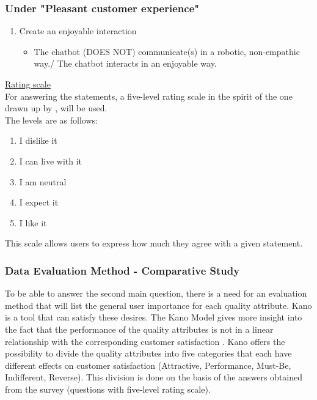 \subsubsection{Under "Pleasant customer experience"}
\begin{enumerate}
	\item Create an enjoyable interaction
	\begin{itemize}
		\item The chatbot (DOES NOT) communicate(s) in a robotic, non-empathic way./ The chatbot interacts in an enjoyable way.
	\end{itemize}
\end{enumerate}
\ul{Rating scale}\\
For answering the statements, a five-level rating scale in the spirit of the one drawn up by \citep{KANO1984}, will be used.\\
\break
The levels are as follows:\\
\begin{enumerate}
	\item I dislike it
	\item I can live with it
	\item I am neutral
	\item I expect it
	\item I like it
\end{enumerate}
This scale allows users to express how much they agree with a given statement.\\

\subsubsection{Data Evaluation Method - Comparative Study}
To be able to answer the second main question, there is a need for an evaluation method that will list the general user importance for each quality attribute. Kano is a tool that can satisfy these desires. The Kano Model gives more insight into the fact that the performance of the quality attributes is not in a linear relationship with the corresponding customer satisfaction \citep{KANO1984}. Kano offers the possibility to divide the quality attributes into five categories that each have different effects on customer satisfaction (Attractive, Performance, Must-Be, Indifferent, Reverse). This division is done on the basis of the answers obtained from the survey (questions with five-level rating scale).\\

